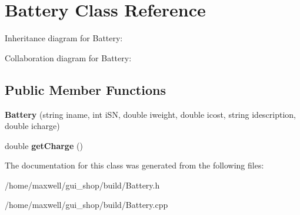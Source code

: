 \hypertarget{classBattery}{}\section{Battery Class Reference}
\label{classBattery}


Inheritance diagram for Battery\+:


Collaboration diagram for Battery\+:
\subsection*{Public Member Functions}
\begin{DoxyCompactItemize}
\item 
{\bfseries Battery} (string iname, int i\+SN, double iweight, double icost, string idescription, double icharge)\hypertarget{classBattery_ac0f8c6f4d61eb6c743a8c6671b236f23}{}\label{classBattery_ac0f8c6f4d61eb6c743a8c6671b236f23}

\item 
double {\bfseries get\+Charge} ()\hypertarget{classBattery_a4f9580c1692db2be0b4c077e42d5a9ab}{}\label{classBattery_a4f9580c1692db2be0b4c077e42d5a9ab}

\end{DoxyCompactItemize}


The documentation for this class was generated from the following files\+:\begin{DoxyCompactItemize}
\item 
/home/maxwell/gui\+\_\+shop/build/Battery.\+h\item 
/home/maxwell/gui\+\_\+shop/build/Battery.\+cpp\end{DoxyCompactItemize}
